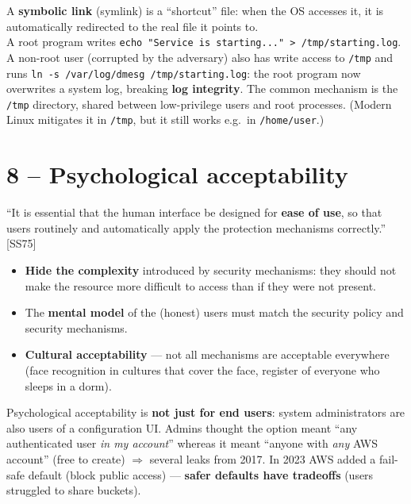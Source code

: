 \begin{exbox}[title=Symlink attack in \texttt{/tmp}]
A \textbf{symbolic link} (symlink) is a ``shortcut'' file: when the OS accesses it, it is
automatically redirected to the real file it points to. \\
A root program writes \texttt{echo "Service is starting..." > /tmp/starting.log}. A
non-root user (corrupted by the adversary) also has write access to \texttt{/tmp} and
runs \texttt{ln -s /var/log/dmesg /tmp/starting.log}: the root program now overwrites a
system log, breaking \textbf{log integrity}. The common mechanism is the \texttt{/tmp}
directory, shared between low-privilege users and root processes. (Modern Linux
mitigates it in \texttt{/tmp}, but it still works e.g.\ in \texttt{/home/user}.)
\end{exbox}

\section{8 -- Psychological acceptability}

\begin{defnbox}[title=Psychological acceptability]
``It is essential that the human interface be designed for \textbf{ease of use}, so that
users routinely and automatically apply the protection mechanisms correctly.'' [SS75]
\end{defnbox}

\begin{propbox}[title=What it implies]
\begin{itemize}
  \item \textbf{Hide the complexity} introduced by security mechanisms: they should not
        make the resource more difficult to access than if they were not present.
  \item The \textbf{mental model} of the (honest) users must match the security policy
        and security mechanisms.
  \item \textbf{Cultural acceptability} --- not all mechanisms are acceptable everywhere
        (face recognition in cultures that cover the face, register of everyone who
        sleeps in a dorm).
\end{itemize}
\end{propbox}

\begin{exbox}[title=Amazon S3 ``Any Authenticated AWS User'']
Psychological acceptability is \textbf{not just for end users}: system administrators
are also users of a configuration UI. Admins thought the option meant ``any
authenticated user \emph{in my account}'' whereas it meant ``anyone with \emph{any} AWS
account'' (free to create) $\Rightarrow$ several leaks from 2017. In 2023 AWS added a
fail-safe default (block public access) --- \textbf{safer defaults have tradeoffs}
(users struggled to share buckets).
\end{exbox}

